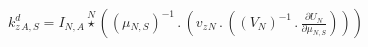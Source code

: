 \documentclass[border=2pt]{standalone}
\begin{document}
${{k^d_z}}{_{A, S}}={{I}}{_{N, A}} \stackrel{N}{\star} \left(\left( {{\mu}}{_{N, S}} \right)^{-1} \, . \, \left({{v_z}}{_{N}} \, . \, \left(\left( {V}{_{N}} \right)^{-1} \, . \, \frac{\partial{{U}{_{N}}}}{\partial{{{\mu}}{_{N, S}}}}\right)\right)\right)$
\end{document}

